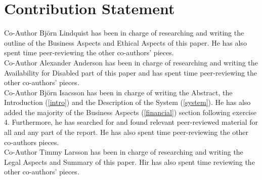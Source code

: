 \documentclass[conference]{IEEEtran}
\begin{document}
\section{Contribution Statement}
\label{contribution}

Co-Author Björn Lindquist has been in charge of researching and writing the outline of the Business Aspects and Ethical Aspects of this paper. He has also spent time peer-reviewing the other co-authors' pieces.
\\Co-Author Alexander Anderson has been in charge of researching and writing the Availability for Disabled part of this paper and has spent time peer-reviewing the other co-authors' pieces.
\\Co-Author Björn Isacsson has been in charge of writing the Abstract, the Introduction (\ref{intro}) and the Description of the System (\ref{system}). He has also added the majority of the Business Aspects (\ref{financial}) section following exercise 4. Furthermore, he has searched for and found relevant peer-reviewed material for all and any part of the report. He has also spent time peer-reviewing the other co-authors pieces. 
\\Co-Author Timmy Larsson has been in charge of researching and writing the Legal Aspects and Summary of this paper. Hir has also spent time reviewing the other co-authors' pieces.
\end{document}
